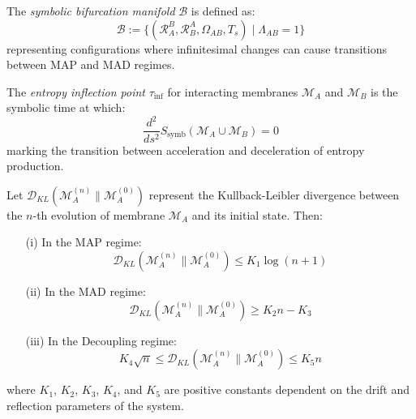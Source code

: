 \begin{definition} \label{definition:bk5_symbolic_bifurcation_man} 

The \emph{symbolic bifurcation manifold} $\mathcal{B}$ is defined as:
\begin{equation}
\mathcal{B} := \{(\mathcal{R}_A^B, \mathcal{R}_B^A, \Omega_{AB}, T_s) \mid \Lambda_{AB} = 1 \}
\end{equation}
\noindent representing configurations where infinitesimal changes can cause transitions between MAP and MAD regimes.
\end{definition}
\begin{definition} \label{definition:bk5_entropy_inflection_point} 

The \emph{entropy inflection point} $\tau_{\text{inf}}$ for interacting membranes $\mathscr{M}_A$ and $\mathscr{M}_B$ is the symbolic time at which:
\begin{equation}
\frac{d^2}{ds^2}S_{\text{symb}}(\mathscr{M}_A \cup \mathscr{M}_B) = 0
\end{equation}
\noindent marking the transition between acceleration and deceleration of entropy production.
\end{definition}
\begin{lemma} \label{lemma:bk5_symbolic_divergence_bounds} 
Let $\mathcal{D}_{KL}(\mathscr{M}_A^{(n)} \parallel \mathscr{M}_A^{(0)})$ represent the Kullback-Leibler divergence between the $n$-th evolution of membrane $\mathscr{M}_A$ and its initial state. Then:
\begin{enumerate}
  \item[(i)] In the MAP regime:
  \begin{equation}
  \mathcal{D}_{KL}(\mathscr{M}_A^{(n)} \parallel \mathscr{M}_A^{(0)}) \leq K_1 \log(n + 1)
  \end{equation}
  \item[(ii)] In the MAD regime:
  \begin{equation}
  \mathcal{D}_{KL}(\mathscr{M}_A^{(n)} \parallel \mathscr{M}_A^{(0)}) \geq K_2 n - K_3
  \end{equation}
  \item[(iii)] In the Decoupling regime:
  \begin{equation}
  K_4 \sqrt{n} \leq \mathcal{D}_{KL}(\mathscr{M}_A^{(n)} \parallel \mathscr{M}_A^{(0)}) \leq K_5 n
  \end{equation}
\end{enumerate}
\noindent where $K_1$, $K_2$, $K_3$, $K_4$, and $K_5$ are positive constants dependent on the drift and reflection parameters of the system.
\end{lemma}
